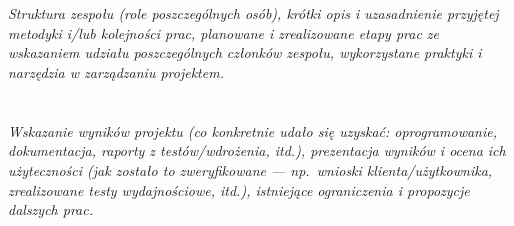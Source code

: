 \documentclass[polish,12pt]{aghthesis}
\begin{document}
\section{\SectionTitleWorkOrganization}
\label{sec:organizacja-pracy}
\emph{Struktura zespołu (role poszczególnych osób), krótki opis i
    uzasadnienie przyjętej metodyki i/lub kolejności prac, planowane i
    zrealizowane etapy prac ze wskazaniem udziału poszczególnych
    członków zespołu, wykorzystane praktyki i narzędzia w zarządzaniu
    projektem.}

\section{\SectionTitleResults}
\label{sec:wyniki-projektu}
\emph{Wskazanie wyników projektu (co konkretnie udało się uzyskać:
    oprogramowanie, dokumentacja, raporty z testów/wdrożenia, itd.), prezentacja wyników
    i ocena ich użyteczności (jak zostało to zweryfikowane --- np.\ wnioski
    klienta/użytkownika, zrealizowane testy wydajnościowe, itd.),
    istniejące ograniczenia i propozycje dalszych prac.}

\clearpage


\end{document}
